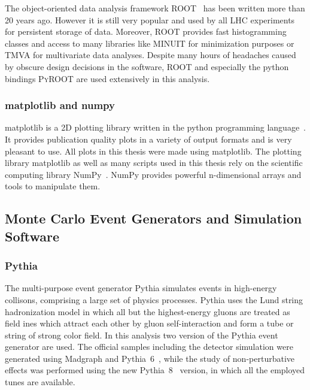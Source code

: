 The object-oriented data analysis framework ROOT~\cite{Brun:1997pa} has been
written more than 20 years ago. However it is still very popular and used by all
LHC experiments for persistent storage of data. Moreover, ROOT provides fast
histogramming classes and access to many libraries like MINUIT for minimization
purposes or TMVA for multivariate data analyses. Despite many hours of headaches
caused by obscure design decisions in the software, ROOT and especially the
python bindings \textsc{PyROOT} are used extensively in this analysis.

\subsubsection{matplotlib and numpy}

matplotlib is a 2D plotting library written in the python programming language~\cite{Hunter:2007aa}. It
provides publication quality plots in a variety of output formats and is very
pleasant to use. All plots in this thesis were made using matplotlib. The
plotting library matplotlib as well as many scripts used in this thesis rely on
the scientific computing library NumPy~\cite{Oliphant:2007aa}. NumPy provides
powerful n-dimensional arrays and tools to manipulate them. 

\subsection{Monte Carlo Event Generators and Simulation Software}
\label{subsection:mc_generators}

\subsubsection{Pythia}

The multi-purpose event generator Pythia simulates events in high-energy
collisons, comprising a large set of physics processes. Pythia uses the Lund
string hadronization model in which all but the highest-energy gluons are
treated as field ines which attract each other by gluon self-interaction and
form a tube or string of strong color field. In this analysis two version of the
Pythia event generator are used. The official samples including the detector
simulation were generated using Madgraph and Pythia~6~\cite{Sjostrand:2006za},
while the study of non-perturbative effects was performed using the new
Pythia~8~\cite{Sjostrand:2007gs} version, in which all the employed tunes are
available. 

